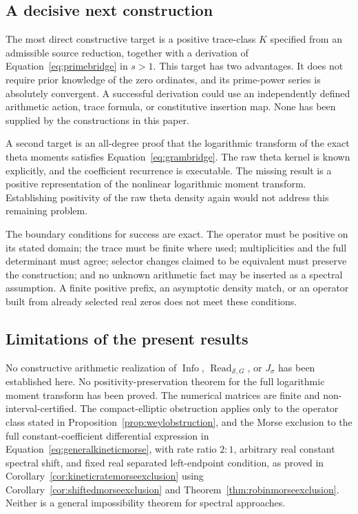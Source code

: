 \documentclass[11pt,letterpaper]{article}
\numberwithin{equation}{section}
\theoremstyle{definition}
\theoremstyle{remark}
\DeclareMathOperator{\Info}{Info}
\DeclareMathOperator{\Read}{Read}
\begin{document}
\subsection{A decisive next construction}
The most direct constructive target is a positive trace-class $K$ specified from an admissible source reduction, together with a derivation of Equation~\eqref{eq:primebridge} in $s>1$. This target has two advantages. It does not require prior knowledge of the zero ordinates, and its prime-power series is absolutely convergent. A successful derivation could use an independently defined arithmetic action, trace formula, or constitutive insertion map. None has been supplied by the constructions in this paper.

A second target is an all-degree proof that the logarithmic transform of the exact theta moments satisfies Equation~\eqref{eq:grambridge}. The raw theta kernel is known explicitly, and the coefficient recurrence is executable. The missing result is a positive representation of the nonlinear logarithmic moment transform. Establishing positivity of the raw theta density again would not address this remaining problem.

The boundary conditions for success are exact. The operator must be positive on its stated domain; the trace must be finite where used; multiplicities and the full determinant must agree; selector changes claimed to be equivalent must preserve the construction; and no unknown arithmetic fact may be inserted as a spectral assumption. A finite positive prefix, an asymptotic density match, or an operator built from already selected real zeros does not meet these conditions.

\subsection{Limitations of the present results}
No constructive arithmetic realization of $\Info$, $\Read_{\mathcal S,G}$, or $J_\sigma$ has been established here. No positivity-preservation theorem for the full logarithmic moment transform has been proved. The numerical matrices are finite and non-interval-certified. The compact-elliptic obstruction applies only to the operator class stated in Proposition~\ref{prop:weylobstruction}, and the Morse exclusion to the full constant-coefficient differential expression in Equation~\eqref{eq:generalkineticmorse}, with rate ratio $2:1$, arbitrary real constant spectral shift, and fixed real separated left-endpoint condition, as proved in Corollary~\ref{cor:kineticratemorseexclusion} using Corollary~\ref{cor:shiftedmorseexclusion} and Theorem~\ref{thm:robinmorseexclusion}. Neither is a general impossibility theorem for spectral approaches.
\end{document}
